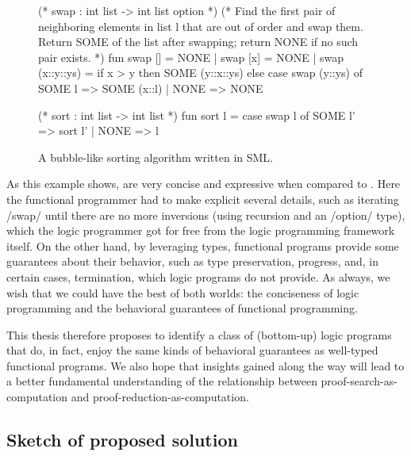 \begin{figure}
  \begin{smlcode}
  (* swap : int list -> int list option *)
  (* Find the first pair of neighboring elements
     in list l that are out of order and swap them.
     Return SOME of the list after swapping;
     return NONE if no such pair exists. *)
  fun swap [] = NONE
    | swap [x] = NONE
    | swap (x::y::ys) =
        if x > y
        then
          SOME (y::x::ys)
        else
          case swap (y::ys) of
            SOME l => SOME (x::l)
          | NONE => NONE

  (* sort : int list -> int list *)
  fun sort l =
        case swap l of
          SOME l' => sort l'
        | NONE => l
  \end{smlcode}
  \caption{A bubble-like sorting algorithm written in \acl{SML}.\label{fig:bubble-sml}}
\end{figure}

As this example shows,  are very concise and expressive when compared to .
Here the functional programmer had to make explicit several details, such as iterating \sml/swap/ until there are no more inversions (using recursion and an \sml/option/ type), which the logic programmer got for free from the logic programming framework itself.
On the other hand, by leveraging types, functional programs provide some guarantees about their behavior, such as type preservation, progress, and, in certain cases, termination, which logic programs do not provide.
As always, we wish that we could have the best of both worlds: the conciseness of logic programming and the behavioral guarantees of functional programming.

This thesis therefore proposes to identify a class of (bottom-up) logic programs that do, in fact, enjoy the same kinds of behavioral guarantees as well-typed functional programs.
We also hope that insights gained along the way will lead to a better fundamental understanding of the relationship between proof-search-as-computation and proof-reduction-as-computation.

\subsection{Sketch of proposed solution}\label{sec:sketch-solution}


